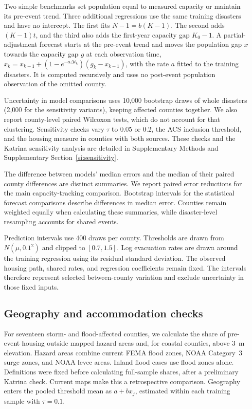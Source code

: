 \documentclass[11pt]{article}
\begin{document}
Two simple benchmarks set population equal to measured capacity or maintain its pre-event trend. Three additional regressions use the same training disasters and have no intercept. The first fits $N-1=b(K-1)$. The second adds $(K-1)t$, and the third also adds the first-year capacity gap $K_0-1$. A partial-adjustment forecast starts at the pre-event trend and moves the population gap $x$ towards the capacity gap $g$ at each observation time, $x_k=x_{k-1}+(1-e^{-a\Delta t_k})(g_k-x_{k-1})$, with the rate $a$ fitted to the training disasters. It is computed recursively and uses no post-event population observation of the omitted county.

Uncertainty in model comparisons uses 10{,}000 bootstrap draws of whole disasters (2{,}000 for the sensitivity variants), keeping affected counties together. We also report county-level paired Wilcoxon tests, which do not account for that clustering. Sensitivity checks vary $\tau$ to 0.05 or 0.2, the ACS inclusion threshold, and the housing measure in counties with both sources. These checks and the Katrina sensitivity analysis are detailed in Supplementary Methods and Supplementary Section~\ref{si:sensitivity}.

The difference between models' median errors and the median of their paired county differences are distinct summaries. We report paired error reductions for the main capacity-tracking comparison. Bootstrap intervals for the statistical forecast comparisons describe differences in median error. Counties remain weighted equally when calculating these summaries, while disaster-level resampling accounts for shared events.

Prediction intervals use 400 draws per county. Thresholds are drawn from $N(\mu,0.1^2)$ and clipped to $[0.7,1.5]$. Log evacuation rates are drawn around the training regression using its residual standard deviation. The observed housing path, shared rates, and regression coefficients remain fixed. The intervals therefore represent selected between-county variation and exclude uncertainty in those fixed inputs.

\subsection*{Geography and accommodation checks}

For seventeen storm- and flood-affected counties, we calculate the share of pre-event housing outside mapped hazard areas and, for coastal counties, above 3~m elevation. Hazard areas combine current FEMA flood zones, NOAA Category~3 surge zones, and NOAA levee areas. Inland flood cases use flood zones alone. Definitions were fixed before calculating full-sample shares, after a preliminary Katrina check. Current maps make this a retrospective comparison. Geography enters the pooled threshold mean as $a+bx_j$, estimated within each training sample with $\tau=0.1$.
\end{document}
